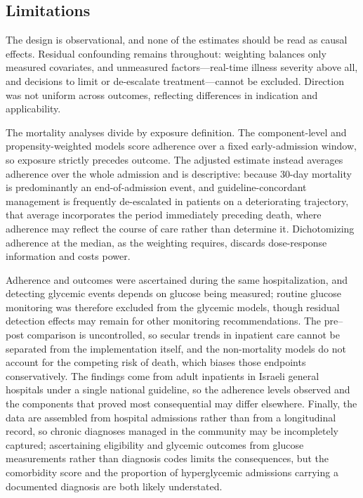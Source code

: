 \subsection{Limitations}

The design is observational, and none of the estimates should be read as causal
effects. Residual confounding remains throughout: weighting balances only
measured covariates, and unmeasured factors---real-time illness severity above
all, and decisions to limit or de-escalate treatment---cannot be excluded.
Direction was not uniform across outcomes, reflecting differences in indication
and applicability.

The mortality analyses divide by exposure definition. The component-level and
propensity-weighted models score adherence over a fixed early-admission window,
so exposure strictly precedes outcome. The adjusted estimate instead averages
adherence over the whole admission and is descriptive: because 30-day mortality
is predominantly an end-of-admission event, and guideline-concordant management
is frequently de-escalated in patients on a deteriorating trajectory, that
average incorporates the period immediately preceding death, where adherence
may reflect the course of care rather than determine it. Dichotomizing
adherence at the median, as the weighting requires, discards dose-response
information and costs power.

Adherence and outcomes were ascertained during the same hospitalization, and
detecting glycemic events depends on glucose being measured; routine glucose
monitoring was therefore excluded from the glycemic models, though residual
detection effects may remain for other monitoring recommendations. The
pre--post comparison is uncontrolled, so secular trends in inpatient care
cannot be separated from the implementation itself, and the non-mortality
models do not account for the competing risk of death, which biases those
endpoints conservatively. The findings come from adult inpatients in Israeli
general hospitals under a single national guideline, so the adherence levels
observed and the components that proved most consequential may differ
elsewhere. Finally, the data are assembled from hospital admissions rather than
from a longitudinal record, so chronic diagnoses managed in the community may
be incompletely captured; ascertaining eligibility and glycemic outcomes from
glucose measurements rather than diagnosis codes limits the consequences, but
the comorbidity score and the proportion of hyperglycemic admissions carrying a
documented diagnosis are both likely understated.
